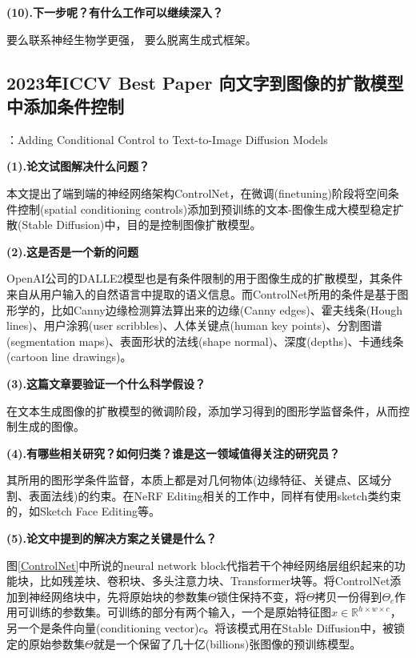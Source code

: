 \documentclass[12pt, a4paper, oneside]{ctexart}
\begin{document}
    \noindent\textbf{(10).下一步呢？有什么工作可以继续深入？}

    要么联系神经生物学更强， 要么脱离生成式框架。


    \subsection{2023年ICCV Best Paper 向文字到图像的扩散模型中添加条件控制\cite{zhang2023adding}}
    ：{Adding Conditional Control to Text-to-Image Diffusion Models}

    \noindent\textbf{(1).论文试图解决什么问题？}

    本文提出了端到端的神经网络架构ControlNet，在微调(finetuning)阶段将空间条件控制(spatial conditioning controls)添加到预训练的文本-图像生成大模型稳定扩散(Stable Diffusion)中，目的是控制图像扩散模型。

    \noindent\textbf{(2).这是否是一个新的问题}

    OpenAI公司的DALLE2模型\cite{ramesh2022hierarchical}也是有条件限制的用于图像生成的扩散模型，其条件来自从用户输入的自然语言中提取的语义信息。而ControlNet所用的条件是基于图形学的，比如Canny边缘检测算法算出来的边缘(Canny edges)、霍夫线条(Hough lines)、用户涂鸦(user scribbles)、人体关键点(human key points)、分割图谱(segmentation maps)、表面形状的法线(shape normal)、深度(depths)、卡通线条(cartoon line drawings)。

    \noindent\textbf{(3).这篇文章要验证一个什么科学假设？}

    在文本生成图像的扩散模型的微调阶段，添加学习得到的图形学监督条件，从而控制生成的图像。

    \noindent\textbf{(4).有哪些相关研究？如何归类？谁是这一领域值得关注的研究员？}

    其所用的图形学条件监督，本质上都是对几何物体(边缘特征、关键点、区域分割、表面法线)的约束。在NeRF Editing相关的工作中，同样有使用sketch类约束的，如Sketch Face Editing等。

    \noindent\textbf{(5).论文中提到的解决方案之关键是什么？}


    图\ref{ControlNet}中所说的neural network block代指若干个神经网络层组织起来的功能块，比如残差块、卷积块、多头注意力块、Transformer块等。将ControlNet添加到神经网络块中，先将原始块的参数集$\Theta$锁住保持不变，将$\Theta$拷贝一份得到$\Theta_c$作用可训练的参数集。可训练的部分有两个输入，一个是原始特征图$x \in \mathbb{R}^{h \times w \times c}$，另一个是条件向量(conditioning vector)$c$。将该模式用在Stable Diffusion中，被锁定的原始参数集$\Theta$就是一个保留了几十亿(billions)张图像的预训练模型。
\end{document}
